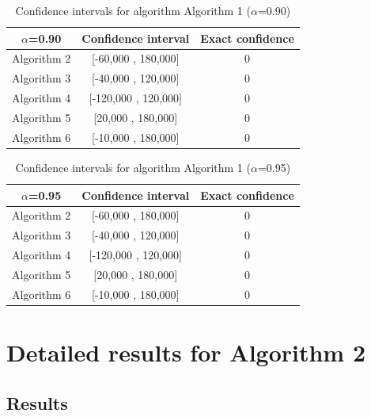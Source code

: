 \documentclass[a4paper,10pt]{article}
\begin{document}
\begin{table}[!htp]
\centering\small
\begin{tabular}{
|c|c|c|}
\hline
 $\alpha$=0.90 & Confidence interval & Exact confidence \\ \hline 
Algorithm 2 & [-60,000 , 180,000] & 0\\ \hline 
Algorithm 3 & [-40,000 , 120,000] & 0\\ \hline 
Algorithm 4 & [-120,000 , 120,000] & 0\\ \hline 
Algorithm 5 & [20,000 , 180,000] & 0\\ \hline 
Algorithm 6 & [-10,000 , 180,000] & 0\\ \hline 

\end{tabular}
\caption{Confidence intervals for algorithm Algorithm 1 ($\alpha$=0.90)}
\end{table}
\begin{table}[!htp]
\centering\small
\begin{tabular}{
|c|c|c|}
\hline
 $\alpha$=0.95 & Confidence interval & Exact confidence \\ \hline 
Algorithm 2 & [-60,000 , 180,000] & 0\\ \hline 
Algorithm 3 & [-40,000 , 120,000] & 0\\ \hline 
Algorithm 4 & [-120,000 , 120,000] & 0\\ \hline 
Algorithm 5 & [20,000 , 180,000] & 0\\ \hline 
Algorithm 6 & [-10,000 , 180,000] & 0\\ \hline 

\end{tabular}
\caption{Confidence intervals for algorithm Algorithm 1 ($\alpha$=0.95)}
\end{table}

 \clearpage 


\section{Detailed results for Algorithm 2}


\subsection{Results}
\end{document}
